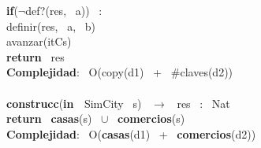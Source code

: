 \begin{Algoritmos}
\indent \indent \textbf{if}($\neg$def?(res, \ a)) \ :\\
\indent \indent \indent definir(res, \ a, \ b)\\
\indent \indent avanzar(itCs)\\
\indent \textbf{return} \ res\\
\textbf{Complejidad}: \ O(copy(d1) \ + \ $ \# $claves(d2))\\
\noindent\makebox[\linewidth]{\rule{\textwidth}{0.4pt}}
\\
\noindent\makebox[\linewidth]{\rule{\textwidth}{0.4pt}}
\textbf{construcc}(\textbf{in \ }SimCity \ s) \ $\rightarrow $ \ res \ : \ Nat\\
\indent \textbf{return} \ \textbf{casas}(s) \ $\cup$ \ \textbf{comercios}(s)\\
\textbf{Complejidad}: \ O(\textbf{casas}(d1) \ + \ \textbf{comercios}(d2))\\
\noindent\makebox[\linewidth]{\rule{\textwidth}{0.4pt}}
\\
\\
\\
\end{Algoritmos}

